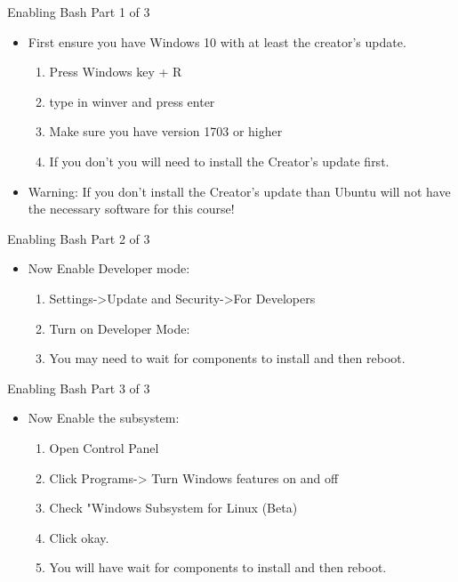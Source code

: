 \documentclass{beamer}
\begin{document}
\begin{frame}{Enabling Bash Part 1 of 3}
\begin{itemize}
\item First ensure you have Windows 10 with at least the creator's update.
\begin{enumerate}
\item Press Windows key + R
\item type in winver and press enter
\item Make sure you have version 1703 or higher
\item If you don't you will need to install the Creator's update first.
\end{enumerate}
\item Warning: If you don't install the Creator's update than Ubuntu will not have the necessary software for this course!
\end{itemize}
\end{frame}

\begin{frame}{Enabling Bash Part 2 of 3}
\begin{itemize}
\item Now Enable Developer mode:
\begin{enumerate}
\item Settings->Update and Security->For Developers
\item Turn on Developer Mode:
\item You may need to wait for components to install and then reboot.
\end{enumerate}
\end{itemize}
\end{frame}

\begin{frame}{Enabling Bash Part 3 of 3}
\begin{itemize}
\item Now Enable the subsystem:
\begin{enumerate}
\item Open Control Panel
\item Click Programs-> Turn Windows features on and off
\item Check "Windows Subsystem for Linux (Beta)
\item Click okay.
\item You will have wait for components to install and then reboot.
\end{enumerate}
\end{itemize}
\end{frame}
\end{document}
